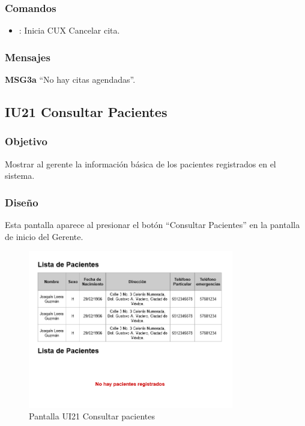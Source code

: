\subsubsection{Comandos}
\begin{itemize}
	\item {}: Inicia CUX Cancelar cita.
\end{itemize}

\subsubsection{Mensajes}
\begin{Citemize}
	\item {\bf MSG3a} ``No hay citas agendadas''.
\end{Citemize}


\subsection{IU21 Consultar Pacientes}

\subsubsection{Objetivo}
Mostrar al gerente la información básica de los pacientes registrados en el sistema.

\subsubsection{Diseño}
Esta pantalla aparece al presionar el botón ``Consultar Pacientes'' en la pantalla de inicio del Gerente.

\begin{figure}[htbp!]
	\centering
	\includegraphics[width=0.8\textwidth]{images/gui/ui21_consultar_pacientes}
	\caption{Pantalla UI21 Consultar pacientes}
\end{figure}

